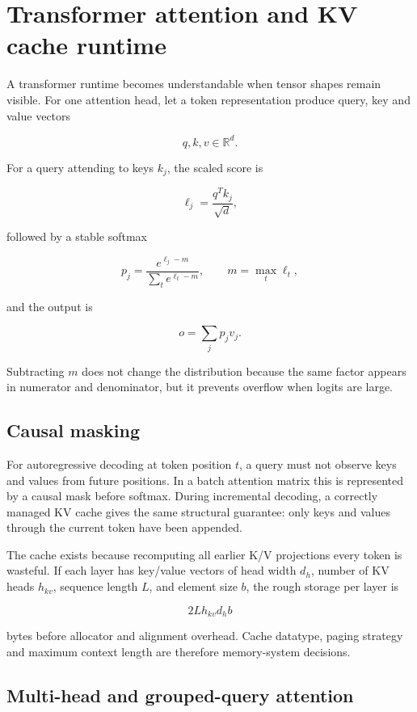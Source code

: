 \hypertarget{appendix-ea2dadd21ce5}{}
\section{Transformer attention and KV cache runtime}\label{appendix-ea2dadd21ce5-transformer-attention-and-kv-cache-runtime}

A transformer runtime becomes understandable when tensor shapes remain visible. For one attention head, let a token representation produce query, key and value vectors

\[
q,k,v \in \mathbb{R}^{d}.
\]

For a query attending to keys \(k_j\), the scaled score is

\[
\ell_j = \frac{q^T k_j}{\sqrt{d}},
\]

followed by a stable softmax

\[
p_j = \frac{e^{\ell_j-m}}{\sum_t e^{\ell_t-m}},
\qquad m=\max_t \ell_t,
\]

and the output is

\[
o = \sum_j p_j v_j.
\]

Subtracting \(m\) does not change the distribution because the same factor appears in numerator and denominator, but it prevents overflow when logits are large.

\subsection{Causal masking}\label{appendix-ea2dadd21ce5-causal-masking}

For autoregressive decoding at token position \(t\), a query must not observe keys and values from future positions. In a batch attention matrix this is represented by a causal mask before softmax. During incremental decoding, a correctly managed KV cache gives the same structural guarantee: only keys and values through the current token have been appended.

The cache exists because recomputing all earlier K/V projections every token is wasteful. If each layer has key/value vectors of head width \(d_h\), number of KV heads \(h_{kv}\), sequence length \(L\), and element size \(b\), the rough storage per layer is

\[
2 L h_{kv} d_h b
\]

bytes before allocator and alignment overhead. Cache datatype, paging strategy and maximum context length are therefore memory-system decisions.

\subsection{Multi-head and grouped-query attention}\label{appendix-ea2dadd21ce5-multi-head-and-grouped-query-attention}


